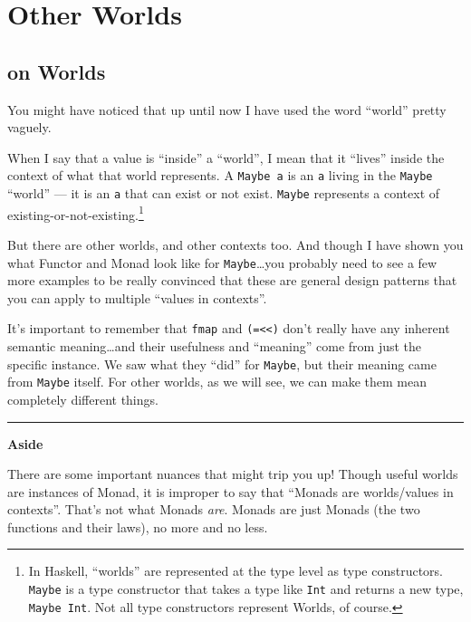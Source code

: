 \documentclass[]{article}
\begin{document}
\hypertarget{other-worlds}{%
\section{Other Worlds}\label{other-worlds}}

\hypertarget{on-worlds}{%
\subsection{on Worlds}\label{on-worlds}}

You might have noticed that up until now I have used the word ``world'' pretty
vaguely.

When I say that a value is ``inside'' a ``world'', I mean that it ``lives''
inside the context of what that world represents. A \texttt{Maybe\ a} is an
\texttt{a} living in the \texttt{Maybe} ``world'' --- it is an \texttt{a} that
can exist or not exist. \texttt{Maybe} represents a context of
existing-or-not-existing.\footnote{In Haskell, ``worlds'' are represented at the
  type level as type constructors. \texttt{Maybe} is a type constructor that
  takes a type like \texttt{Int} and returns a new type, \texttt{Maybe\ Int}.
  Not all type constructors represent Worlds, of course.}

But there are other worlds, and other contexts too. And though I have shown you
what Functor and Monad look like for \texttt{Maybe}\ldots{}you probably need to
see a few more examples to be really convinced that these are general design
patterns that you can apply to multiple ``values in contexts''.

It's important to remember that \texttt{fmap} and
\texttt{(=\textless{}\textless{})} don't really have any inherent semantic
meaning\ldots{}and their usefulness and ``meaning'' come from just the specific
instance. We saw what they ``did'' for \texttt{Maybe}, but their meaning came
from \texttt{Maybe} itself. For other worlds, as we will see, we can make them
mean completely different things.

\begin{center}\rule{0.5\linewidth}{\linethickness}\end{center}

\textbf{Aside}

There are some important nuances that might trip you up! Though useful worlds
are instances of Monad, it is improper to say that ``Monads are worlds/values in
contexts''. That's not what Monads \emph{are}. Monads are just Monads (the two
functions and their laws), no more and no less.
\end{document}
